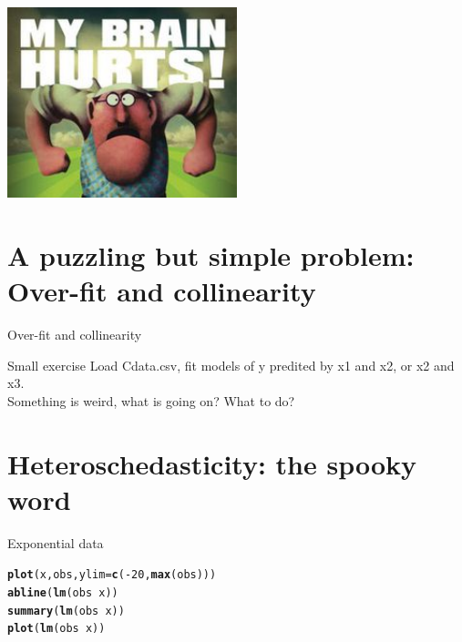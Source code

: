 \documentclass[10pt]{beamer}\usepackage[]{graphicx}\usepackage[]{color}
\makeatletter
\newcommand{\hlnum}[1]{\textcolor[rgb]{0.686,0.059,0.569}{#1}}%
\newcommand{\hlopt}[1]{\textcolor[rgb]{0,0,0}{#1}}%
\newcommand{\hlstd}[1]{\textcolor[rgb]{0.345,0.345,0.345}{#1}}%
\newcommand{\hlkwc}[1]{\textcolor[rgb]{0.333,0.667,0.333}{#1}}%
\newcommand{\hlkwd}[1]{\textcolor[rgb]{0.737,0.353,0.396}{\textbf{#1}}}%
\newenvironment{kframe}{%
 \def\at@end@of@kframe{}%
 \ifinner\ifhmode%
  \def\at@end@of@kframe{\end{minipage}}%
  \begin{minipage}{\columnwidth}%
 \fi\fi%
 \def\FrameCommand##1{\hskip\@totalleftmargin \hskip-\fboxsep
 \colorbox{shadecolor}{##1}\hskip-\fboxsep
     \hskip-\linewidth \hskip-\@totalleftmargin \hskip\columnwidth}%
 \MakeFramed {\advance\hsize-\width
   \@totalleftmargin\z@ \linewidth\hsize
   \@setminipage}}%
 {\par\unskip\endMakeFramed%
 \at@end@of@kframe}
\newenvironment{knitrout}{}{} %
\makeatother
\begin{document}
\begin{frame}
  \begin{center}
    \includegraphics[width=0.5\textwidth]{Figures/brain.jpg}
  \end{center}
\end{frame}

\section{A puzzling but simple problem: Over-fit and collinearity}

\begin{frame}[fragile]{Over-fit and collinearity}
\begin{alertblock}{Small exercise}
Load Cdata.csv, fit models of y predited by x1 and x2, or x2 and x3.\\ Something is weird, what is going on? What to do?
\end{alertblock}
  

  


\end{frame}

\section{Heteroschedasticity: the spooky word}

\begin{frame}[fragile]{Exponential data}



\begin{knitrout}
\color{fgcolor}\begin{kframe}
\begin{alltt}
\hlkwd{plot}\hlstd{(x, obs,} \hlkwc{ylim} \hlstd{=} \hlkwd{c}\hlstd{(}\hlopt{-}\hlnum{20}\hlstd{,} \hlkwd{max}\hlstd{(obs)))}
\hlkwd{abline}\hlstd{(}\hlkwd{lm}\hlstd{(obs} \hlopt{~} \hlstd{x))}
\hlkwd{summary}\hlstd{(}\hlkwd{lm}\hlstd{(obs} \hlopt{~} \hlstd{x))}
\hlkwd{plot}\hlstd{(}\hlkwd{lm}\hlstd{(obs} \hlopt{~} \hlstd{x))}
\end{alltt}
\end{kframe}
\end{knitrout}
\end{frame}
\end{document}
